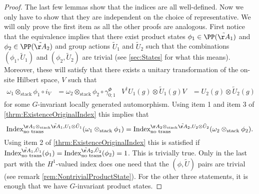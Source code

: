 \begin{proof}
	The last few lemmas show that the indices are all well-defined. Now we only have to show that they are independent on the choice of representative.	We will only prove the first item as all the other proofs are analogous. First notice that the equivalence implies that there exist product states $\phi_1\in\PP(\tilde\AA_1)$ and $\phi_2\in\PP(\tilde\AA_2)$ and group actions $\tilde U_1$ and $\tilde U_2$ such that the combinations $(\phi_1,\tilde U_1)$ and $(\phi_2,\tilde U_2)$ are trivial (see \ref{sec:States} for what this means). Moreover, these will satisfy that there exists a unitary transformation of the on-site Hilbert space, $V$ such that
	\begin{align}
		\omega_1\otimes_{\text{stack}}\phi_1\circ i_V&=\omega_2\otimes_{\text{stack}}\phi_2\circ\gamma^\Phi_{0;1}&V^\dagger U_{1}(g)\otimes \tilde{U}_{1}(g)V&=U_{2}(g)\otimes \tilde{U}_{2}(g)
	\end{align}
	for some $G$-invariant locally generated automorphism. Using item 1 and item 3 of \ref{thrm:ExistenceOriginalIndex} this implies that
	\begin{equation}
		\textrm{Index}^{\AA_1\otimes_{\text{stack}}\tilde \AA_1,U_1\otimes \tilde U_1}_{\text{no trans}}(\omega_1\otimes_{\text{stack}}\phi_1) =\textrm{Index}^{\AA_2\otimes_{\text{stack}}\tilde \AA_2,U_2\otimes\tilde U_2}_{\text{no trans}}(\omega_2\otimes_{\text{stack}}\phi_2).
	\end{equation}
	Using item 2 of \ref{thrm:ExistenceOriginalIndex} this is satisfied if $\textrm{Index}^{\tilde \AA_1,\tilde U_1}_{\text{no trans}}(\phi_1)=\textrm{Index}^{\tilde \AA_2,\tilde U_2}_{\text{no trans}}(\phi_2)=1$. This is trivially true. Only in the last part with the $H^1$-valued index does one need that the $(\phi,\tilde U)$ pairs are trivial (see remark \ref{rem:NontrivialProductState}). For the other three statements, it is enough that we have $G$-invariant product states.
\end{proof}


\cleardoublepage

